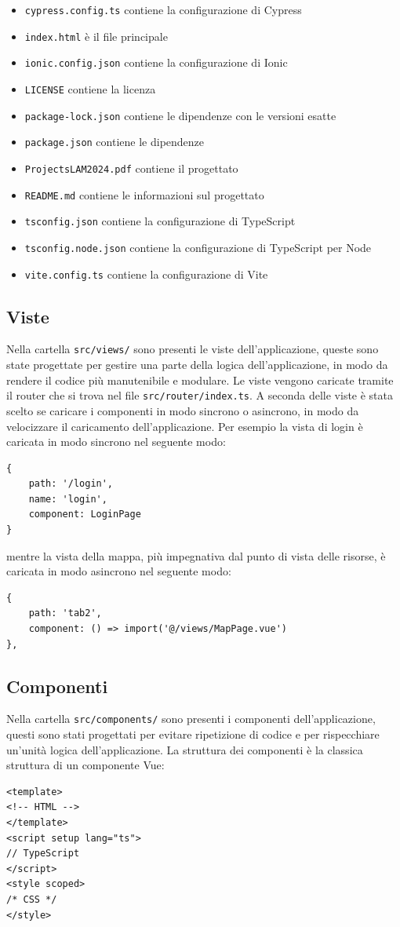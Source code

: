 \documentclass{article}
\begin{document}
\begin{itemize}
    \item \texttt{cypress.config.ts} contiene la configurazione di Cypress
    \item \texttt{index.html} è il file principale
    \item \texttt{ionic.config.json} contiene la configurazione di Ionic
    \item \texttt{LICENSE} contiene la licenza
    \item \texttt{package-lock.json} contiene le dipendenze con le versioni esatte
    \item \texttt{package.json} contiene le dipendenze
    \item \texttt{ProjectsLAM2024.pdf} contiene il progettato
    \item \texttt{README.md} contiene le informazioni sul progettato
    \item \texttt{tsconfig.json} contiene la configurazione di TypeScript
    \item \texttt{tsconfig.node.json} contiene la configurazione di TypeScript per Node
    \item \texttt{vite.config.ts} contiene la configurazione di Vite
\end{itemize}

\subsection{Viste}
Nella cartella \texttt{src/views/} sono presenti le viste dell'applicazione, queste sono state progettate per gestire una parte della logica dell'applicazione, in modo da rendere il codice più manutenibile e modulare.
Le viste vengono caricate tramite il router che si trova nel file \texttt{src/router/index.ts}. A seconda delle viste è stata scelto se caricare i componenti in modo sincrono o asincrono, in modo da velocizzare il caricamento dell'applicazione. Per esempio la vista di login è caricata in modo sincrono nel seguente modo:
\begin{verbatim}
{
    path: '/login',
    name: 'login',
    component: LoginPage
}
\end{verbatim}
mentre la vista della mappa, più impegnativa dal punto di vista delle risorse, è caricata in modo asincrono nel seguente modo:
\begin{verbatim}
{
    path: 'tab2',
    component: () => import('@/views/MapPage.vue')
},
\end{verbatim}

\subsection{Componenti}
Nella cartella \texttt{src/components/} sono presenti i componenti dell'applicazione, questi sono stati progettati per evitare ripetizione di codice e per rispecchiare un'unità logica dell'applicazione.
La struttura dei componenti è la classica struttura di un componente Vue:
\begin{verbatim}
<template>
<!-- HTML -->
</template>
<script setup lang="ts">
// TypeScript
</script>
<style scoped>
/* CSS */
</style>
\end{verbatim}
\end{document}
